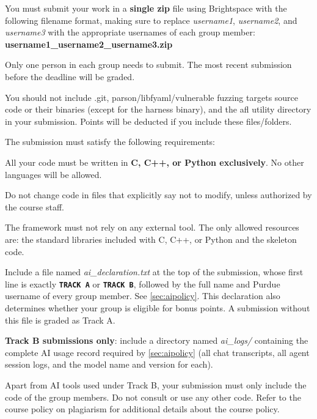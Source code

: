 \documentclass[letterpaper,11pt]{article}
\begin{document}
You must submit your work in a \textbf{single zip} file using
Brightspace with the following
filename format, making sure to replace \textit{username1}, \textit{username2},
and \textit{username3} with the appropriate usernames of each group member:\\
 {\hspace*{30pt}\textbf{username1_username2_username3.zip}}

 Only one person in each group needs to submit. The most recent submission before the deadline will be graded.



You should not include .git, parson/libfyaml/vulnerable fuzzing targets source code or their binaries (except for the harness binary), and the afl utility directory in your submission. Points will be deducted if you include these files/folders.

The submission must satisfy the following requirements:
\squishlist
 \item All your code must be written in \textbf{C, C++, or Python exclusively}. No other languages
will be allowed.
 \item Do not change code in files that explicitly say not to modify, unless authorized by the course staff.
 \item The framework must not rely on any external tool. The only allowed
 resources are: the standard libraries included with C, C++, or Python and the skeleton code.
 \item Include a file named \textit{ai\_declaration.txt} at the top of the
 submission, whose first line is exactly \textbf{\texttt{TRACK A}} or
 \textbf{\texttt{TRACK B}}, followed by the full name and Purdue username of
 every group member. See \autoref{sec:aipolicy}. This declaration also
 determines whether your group is eligible for bonus points. A submission
 without this file is graded as Track A.
 \item \textbf{Track B submissions only}: include a directory named
 \textit{ai\_logs/} containing the complete AI usage record required by
 \autoref{sec:aipolicy} (all chat transcripts, all agent session logs, and the
 model name and version for each).
 \item Apart from AI tools used under Track B, your submission must only
 include the code of the group members. Do not consult or use any other code.
 Refer to the course policy on plagiarism for additional details about the
 course policy.
\end{document}
